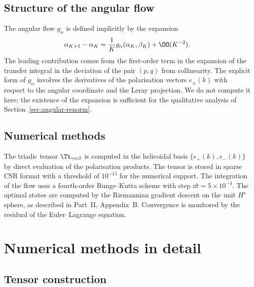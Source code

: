 \subsection{Structure of the angular flow}
\label{app:angular-flow-detail}

The angular flow $g_\alpha$ is defined implicitly by the expansion
\begin{equation*}
\alpha_{K+1} - \alpha_K = \frac{1}{K}g_\alpha(\alpha_K,\beta_K) + 
\OO(K^{-2}).
\end{equation*}
The leading contribution comes from the first-order term in the 
expansion of the transfer integral in the deviation of the pair 
$(p,q)$ from collinearity. The explicit form of $g_\alpha$ involves 
the derivatives of the polarisation vectors $e_\pm(k)$ with respect 
to the angular coordinate and the Leray projection. We do not 
compute it here; the existence of the expansion is sufficient for 
the qualitative analysis of Section~\ref{sec:angular-renorm}.

\subsection{Numerical methods}
\label{app:numeric-methods}

The triadic tensor $\Tt_{\gamma\alpha\beta}$ is computed in the 
helicoidal basis $\{e_+(k),e_-(k)\}$ by direct evaluation of the 
polarisation products. The tensor is stored in sparse CSR format with 
a threshold of $10^{-15}$ for the numerical support. The integration 
of the flow uses a fourth-order Runge--Kutta scheme with step 
$\dd t = 5\times 10^{-4}$. The optimal states are computed by the 
Riemannian gradient descent on the unit $H^s$ sphere, as described in 
Part~II, Appendix~B. Convergence is monitored by the residual of the 
Euler--Lagrange equation.

\section{Numerical methods in detail}
\label{app:numeric}

\subsection{Tensor construction}
\label{app:tensor-construction}

